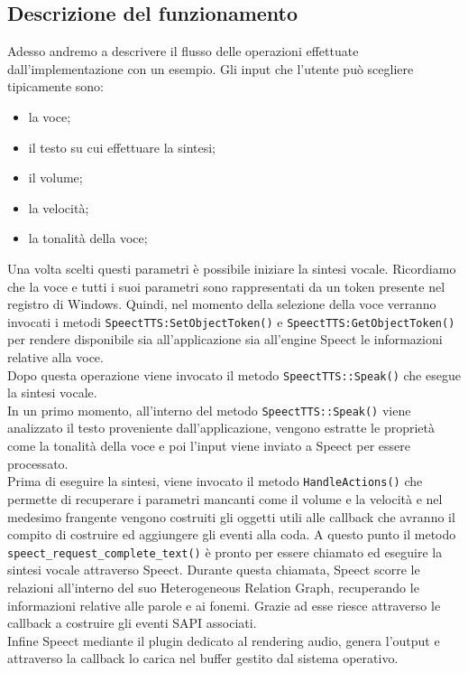 \subsection{Descrizione del funzionamento}
Adesso andremo a descrivere il flusso delle operazioni effettuate dall'implementazione con un esempio.
Gli input che l'utente può scegliere tipicamente sono:
\begin{itemize}
	\item la voce;
	\item il testo su cui effettuare la sintesi;
	\item il volume;
	\item la velocità;
	\item la tonalità della voce;
\end{itemize}
Una volta scelti questi parametri è possibile iniziare la sintesi vocale. Ricordiamo che la voce e tutti i suoi parametri sono rappresentati da un token presente nel registro di Windows.
Quindi, nel momento della selezione della voce verranno invocati i metodi \texttt{SpeectTTS:SetObjectToken()} e \texttt{SpeectTTS:GetObjectToken()} per rendere disponibile sia all'applicazione sia all'engine Speect le informazioni relative alla voce.\\
Dopo questa operazione viene invocato il metodo \texttt{SpeectTTS::Speak()} che esegue la sintesi vocale.\\
In un primo momento, all'interno del metodo \texttt{SpeectTTS::Speak()} viene analizzato il testo proveniente dall'applicazione, vengono estratte le proprietà come la tonalità della voce e poi l'input  viene inviato a Speect per essere processato.\\
Prima di eseguire la sintesi, viene invocato il metodo \texttt{HandleActions()} che permette di recuperare i parametri mancanti come il volume e la velocità e nel medesimo frangente vengono costruiti gli oggetti utili alle callback che avranno il compito di costruire ed aggiungere gli eventi alla coda.
A questo punto il metodo \texttt{speect\_request\_complete\_text()} è pronto per essere chiamato ed eseguire la sintesi vocale attraverso Speect.
Durante questa chiamata, Speect scorre le relazioni all'interno del suo Heterogeneous Relation Graph, recuperando le informazioni relative alle parole e ai fonemi. Grazie ad esse riesce attraverso le callback a costruire gli eventi SAPI associati.\\
Infine Speect mediante il plugin dedicato al rendering audio, genera l'output e attraverso la callback lo carica nel buffer gestito dal sistema operativo.

